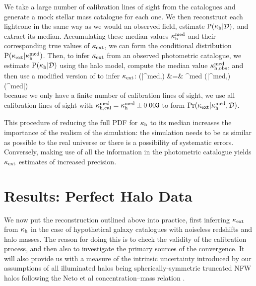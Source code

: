 \documentclass[useAMS,usenatbib,a4paper]{mn2e}
\begin{document}
We  take a large number of
calibration lines of sight from the \MS catalogues and generate a mock
stellar mass catalogue for each one. We then reconstruct each lightcone in the
same way as we would an observed field,
estimate ${\rm P}(\kappa_{\rm h}|{\mathcal{D}})$, and extract its median. Accumulating
these median values $\kappa_{\rm h}^{\rm med}$ and 
their corresponding true values of $\kappa_{\rm ext}$, we can form the 
conditional distribution ${\rm P}(\kappa_{\rm ext}|\kappa_{\rm h}^{\rm med})$. 
Then, to infer $\kappa_{\rm ext}$ from an observed photometric catalogue, we 
estimate ${\rm P}(\kappa_{\rm h}|{\mathcal{D}})$ 
using the halo model, compute the median value 
$\kappa_{\rm h,obs}^{\rm med}$, and then use a modified
version of 
 to infer $\kappa_{\rm ext}$: 
\bea
\Pr(\kappax|\kappah^{\rm med},\data) &=& \int \dee\kappah^{\rm med} 
   \Pr(\kappax|\kappah^{\rm med},\data) \Pr(\kappah^{\rm med}|\data) \notag \\
\label{eq:calkappaconv}   
\eea
{}
because we only have a finite number of calibration lines of sight, we use all
calibration lines of sight with $\kappa_{\rm h,cal}^{\rm med} =
\kappa_{\rm h}^{\rm med}\pm0.003$ to form $\Pr(\kappa_{\rm ext}|\kappa_{\rm h}^{\rm
med},{\mathcal{D}})$.

This procedure of reducing the full PDF for $\kappa_{\rm h}$ to its median increases
the importance of the realism of the simulation: the simulation needs to be as
similar as possible to the real universe or there is a possibility of
systematic errors. Conversely, making use of all the information
in the photometric catalogue yields $\kappa_{\rm ext}$ estimates of increased
precision.


\section{Results: Perfect Halo Data}
\label{sec:knownMh+z} 

We now put the reconstruction \proceedure outlined above into practice, first
inferring $\kappa_{\rm ext}$ from $\kappa_{\rm h}$ in the case of hypothetical galaxy
catalogues with noiseless redshifts and halo masses. The reason for doing this
is to check the validity of the calibration process, and then also to 
investigate the primary sources of the convergence. It will also provide us
with a measure of the intrinsic uncertainty introduced by our assumptions of
all illuminated halos being spherically-symmetric truncated NFW halos following the
Neto et al concentration--mass relation .
\end{document}
